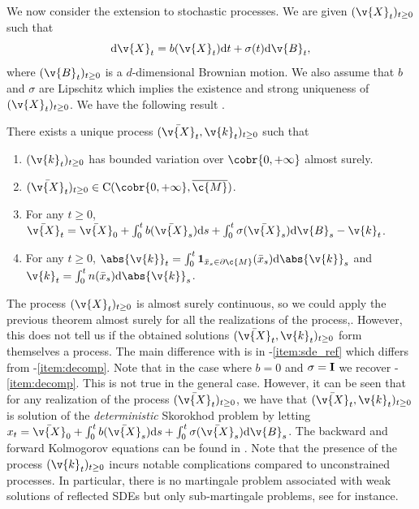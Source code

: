 We now consider the extension to stochastic processes.
We are given $(\v{X}_t)_{t \geq 0}$ such that \begin{equation} \label{eq:sde} \mathrm{d} \v{X}_t = b(\v{X}_t) \mathrm{d} t + \sigma(t) \mathrm{d} \v{B}_t , \end{equation} where $(\v{B}_t)_{t \geq 0}$ is a $d$-dimensional Brownian motion.
We also assume that $b$ and $\sigma$ are Lipschitz which implies the existence and strong uniqueness of $(\v{X}_t)_{t \geq 0}$.
We have the following result \cite{lions1984stochastic}.

\begin{theorem}
	\label{thm:existence_reflected_sto}
	There exists a unique process $(\bar{\v{X}}_t, \v{k}_t)_{t \geq 0}$ such that \begin{enumerate}[label=(\alph*)] \item $(\v{k}_t)_{t \geq 0}$ has bounded variation over $\cobr{0,+\infty}$ almost surely.
		\item $(\bar{\v{X}}_t)_{t \geq 0} \in \mathrm{C}(\cobr{0,+\infty}, \cl{\c{M}})$.
		\item For any $t \geq 0$, $\bar{\v{X}}_t = \bar{\v{X}}_0 + \int_0^t b(\bar{\v{X}}_s) \mathrm{d} s + \int_0^t \sigma(\bar{\v{X}}_s) \mathrm{d} \v{B}_s - \v{k}_t$. \label{item:sde_ref}
		\item For any $t \geq 0$,
		      $\abs{\v{k}}_t = \int_0^t \mathbf{1}_{\bar{x}_s \in \partial \c{M}}(\bar{x}_s) \mathrm{d} \abs{\v{k}}_s$ and
		      $\v{k}_t = \int_0^t n(\bar{x}_s) \mathrm{d} \abs{\v{k}}_s$.
	\end{enumerate}
\end{theorem}

The process $(\v{X}_t)_{t \geq 0}$ is almost surely continuous, so we could apply the previous theorem almost surely for all the realizations of the process,.
However, this does not tell us if the obtained solutions $(\bar{\v{X}}_t, \v{k}_t)_{t \geq 0}$ form themselves a process.
The main difference with  is in -\ref{item:sde_ref} which differs from -\ref{item:decomp}.
Note that in the case where $b=0$ and $\sigma =\m{I}$ we recover -\ref{item:decomp}.
This is not true in the general case.
However, it can be seen that for any realization of the process $(\bar{\v{X}}_t)_{t \geq 0}$, we have that $(\bar{\v{X}}_t, \v{k}_t)_{t \geq 0}$ is solution of the \emph{deterministic} Skorokhod problem by letting $x_t = \bar{\v{X}}_0 + \int_0^t b(\bar{\v{X}}_s) \mathrm{d} s + \int_0^t \sigma(\bar{\v{X}}_s) \mathrm{d} \v{B}_s$.
The backward and forward Kolmogorov equations can be found in \cite{burdzy2004heat}.
Note that the presence of the process $(\v{k}_t)_{t \geq 0}$ incurs notable complications compared to unconstrained processes.
In particular, there is no martingale problem associated with weak solutions of reflected SDEs but only sub-martingale problems, see \cite{kang2017submartingale} for instance.

